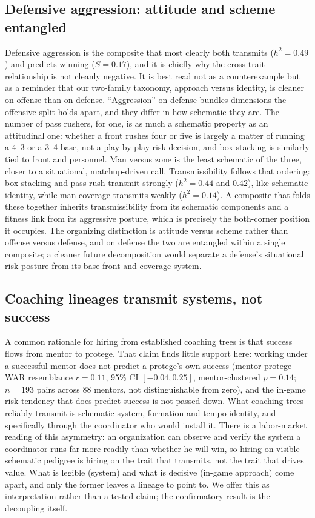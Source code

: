 \documentclass[
  journal=ehs,
  manuscript=article,
  year=2026,
  volume=8,
]{cup-journal}
\begin{document}
\subsection{Defensive aggression: attitude and scheme entangled}
\label{sec:defagg}
Defensive aggression is the composite that most clearly both transmits ($h^{2}=0.49$)
and predicts winning ($S=0.17$), and it is chiefly why the cross-trait relationship is
not cleanly negative. It is best read not as a counterexample but as a reminder that
our two-family taxonomy, approach versus identity, is cleaner on offense than on
defense. ``Aggression'' on defense bundles dimensions the offensive split holds apart, and
they differ in how schematic they are. The number of pass rushers, for one, is as
much a schematic property as an attitudinal one: whether a front rushes four or five
is largely a matter of running a 4--3 or a 3--4 base, not a play-by-play risk
decision, and box-stacking is similarly tied to front and personnel. Man versus zone
is the least schematic of the three, closer to a situational, matchup-driven call.
Transmissibility follows that ordering: box-stacking and pass-rush transmit strongly
($h^{2}=0.44$ and $0.42$), like schematic identity, while man coverage transmits
weakly ($h^{2}=0.14$). A composite that folds these together inherits transmissibility
from its schematic components and a fitness link from its aggressive posture, which is
precisely the both-corner position it occupies. The organizing distinction is attitude
versus scheme rather than offense versus defense, and on defense the two are entangled
within a single composite; a cleaner future decomposition would separate a defense's
situational risk posture from its base front and coverage system.

\subsection{Coaching lineages transmit systems, not success}
A common rationale for hiring from established coaching trees is that success flows
from mentor to protege. That claim finds little support here: working under a
successful mentor does not predict a protege's own success (mentor-protege WAR resemblance $r=0.11$, 95\% CI
$[-0.04,0.25]$, mentor-clustered $p=0.14$; $n=193$ pairs across 88 mentors, not
distinguishable from zero), and the in-game risk tendency that does predict success
is not passed down. What coaching trees
reliably transmit is schematic system, formation and tempo identity, and
specifically through the coordinator who would install it. There is a labor-market
reading of this asymmetry: an organization can observe and verify the system a
coordinator runs far more readily than whether he will win, so hiring on visible
schematic pedigree is hiring on the trait that transmits, not the trait that drives
value. What is legible (system) and what is decisive (in-game approach) come apart,
and only the former leaves a lineage to point to. We offer this as interpretation
rather than a tested claim; the confirmatory result is the decoupling itself.
\end{document}
